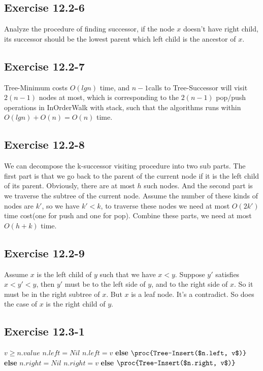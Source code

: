 \documentclass[12pt]{article}
\theoremstyle{definition}
\theoremstyle{remark}
\begin{document}
\subsection*{Exercise 12.2-6}
Analyze the procedure of finding successor, if the node $x$ doesn't have right child, its successor should be the lowest parent which left child is the ancestor of $x$.
\subsection*{Exercise 12.2-7}
Tree-Minimum costs $O(lgn)$ time, and $n-1$calls to Tree-Successor will visit $2(n-1)$ nodes at most, which is corresponding to the $2(n-1)$ pop/push operations in InOrderWalk with stack, such that the algorithms runs within $O(lgn)+O(n)=O(n)$ time.
\subsection*{Exercise 12.2-8}
We can decompose the k-successor visiting procedure into two sub parts. The first part is that we go back to the parent of the current node if it is the left child of its parent. Obviously, there are at most $h$ such nodes. And the second part is we traverse the subtree of the current node. Assume the number of these kinds of nodes are $k'$, so we have $k'<k$, to traverse these nodes we need at most $O(2k')$ time cost(one for push and one for pop). Combine these parts, we need at most $O(h+k)$ time.
\subsection*{Exercise 12.2-9}
Assume $x$ is the left child of $y$ such that we have $x<y$. Suppose $y'$ satisfies $x<y'<y$, then $y'$ must be to the left side of $y$, and to the right side of $x$. So it must be in the right subtree of $x$. But $x$ is a leaf node. It's a contradict. So does the case of $x$ is the right child of $y$.
\subsection*{Exercise 12.3-1}
\begin{codebox}
\li \If $v\ge n.value$ \label{li:if}
\li \quad \If $n.left=Nil$ \label{li:if}
\li \qquad $n.left=v$
\li \quad \textbf{else}
\li \qquad $\proc{Tree-Insert($n.left, v$)}$
\li \textbf{else}
\li \quad \If $n.right=Nil$ \label{li:if}
\li \qquad $n.right=v$
\li \quad \textbf{else}
\li \qquad $\proc{Tree-Insert($n.right, v$)}$
\end{codebox}
\end{document}
